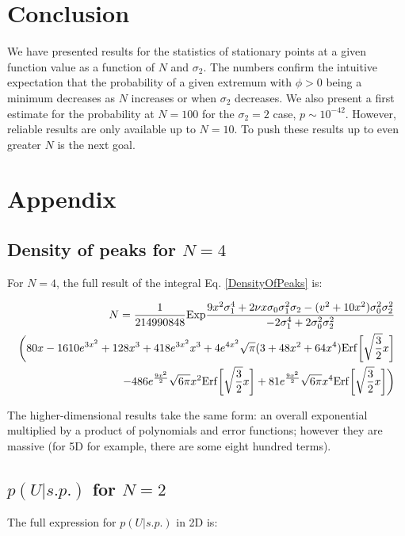 \documentclass[12pt]{article}
\begin{document}
\section{Conclusion}
We have presented results for the statistics of stationary points at a given function value as a function of $N$ and $\sigma_2$. The numbers confirm the intuitive expectation that the probability of a given extremum with $\phi > 0$ being a minimum decreases as $N$ increases or when $\sigma_2$ decreases. We also present a first estimate for the probability at $N=100$ for the $\sigma_2=2$ case, $p \sim 10^{-42}$. However, reliable results are only available up to $N=10$. To push these results up to even greater $N$ is the next goal.

\section{Appendix}
\subsection{Density of peaks for $N=4$} 
For $N=4$, the full result of the integral Eq. \ref{DensityOfPeaks} is:

\begin{equation}
\begin{split}
N = \frac{1}{214990848} \mathrm{Exp}\frac{9x^2\sigma_1^4 + 2\nu x \sigma_0 \sigma_1^2 \sigma_2 - (v^2+10x^2)\sigma_0^2\sigma_2^2}{-2\sigma_1^4+2\sigma_0^2\sigma_2^2}\\\bigg{(}80x - 1610e^{3x^2}+128x^3+418e^{3x^2}x^3+4e^{4x^2}\sqrt{\pi}(3+48x^2+64x^4)\mathrm{Erf}\bigg{[}\sqrt{\frac{3}{2}}x\bigg{]}\\
-486e^{\frac{9x^2}{2}}\sqrt{6\pi}x^2\mathrm{Erf}\bigg{[}\sqrt{\frac{3}{2}}x\bigg{]}+81e^{\frac{9x^2}{2}}\sqrt{6\pi}x^4\mathrm{Erf}\bigg{[}\sqrt{\frac{3}{2}}x\bigg{]}\bigg{)}
\end{split}
\end{equation}

The higher-dimensional results take the same form: an overall exponential multiplied by a product of polynomials and error functions; however they are massive (for 5D for example, there are some eight hundred terms).

\subsection{$p(U|s.p.)$ for $N=2$}
The full expression for $p(U|s.p.)$ in 2D is:
\end{document}
